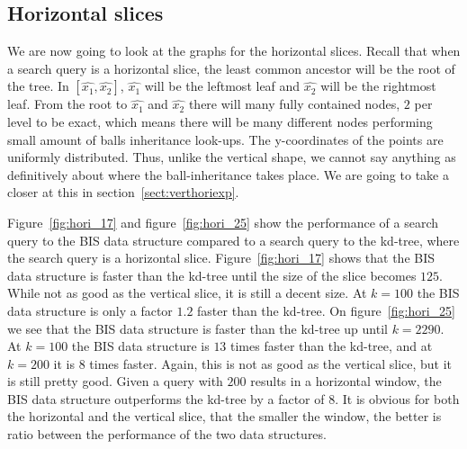 \subsection{Horizontal slices}

We are now going to look at the graphs for the horizontal slices. Recall that when a search query is a horizontal slice, the least common ancestor will be the root of the tree. In $[\hat{x_1}, \hat{x_2}]$, $\hat{x_1}$ will be the leftmost leaf and $\hat{x_2}$ will be the rightmost leaf. From the root to $\hat{x_1}$ and $\hat{x_2}$ there will many fully contained nodes, $2$ per level to be exact, which means there will be many different nodes performing small amount of balls inheritance look-ups. The y-coordinates of the points are uniformly distributed. Thus, unlike the vertical shape, we cannot say anything as definitively about where the ball-inheritance takes place. We are going to take a closer at this in section~\ref{sect:verthoriexp}. 


Figure~\ref{fig:hori_17} and figure~\ref{fig:hori_25} show the performance of a search query to the BIS data structure compared to a search query to the kd-tree, where the search query is a horizontal slice. Figure~\ref{fig:hori_17} shows that the BIS data structure is faster than the kd-tree until the size of the slice becomes $125$. While not as good as the vertical slice, it is still a decent size. At $k = 100$ the BIS data structure is only a factor $1.2$ faster than the kd-tree. On figure~\ref{fig:hori_25} we see that the BIS data structure is faster than the kd-tree up until $k = 2290$. At $k = 100$ the BIS data structure is $13$ times faster than the kd-tree, and at $k = 200$ it is $8$ times faster. Again, this is not as good as the vertical slice, but it is still pretty good. Given a query with $200$ results in a horizontal window, the BIS data structure outperforms the kd-tree by a factor of $8$. It is obvious for both the horizontal and the vertical slice, that the smaller the window, the better is ratio between the performance of the two data structures.


